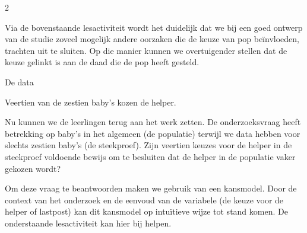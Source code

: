 \begin{multicols}{2}

Via de bovenstaande lesactiviteit wordt het duidelijk dat we bij een goed ontwerp van de studie zoveel mogelijk andere oorzaken die de keuze van pop beïnvloeden, trachten uit te sluiten. Op die manier kunnen we overtuigender stellen dat de keuze gelinkt is aan de daad die de pop heeft gesteld. 

\begin{kader}{}{De data}

Veertien van de zestien baby's kozen de helper. 
\end{kader}

Nu kunnen we de leerlingen terug aan het werk zetten. De onderzoeksvraag heeft betrekking op baby's in het algemeen (de populatie) terwijl we data hebben voor slechts zestien baby's (de steekproef). Zijn veertien keuzes voor de helper in de steekproef voldoende bewijs om te besluiten dat de helper in de populatie vaker gekozen wordt? 

Om deze vraag te beantwoorden maken we gebruik van een kansmodel. Door de context van het onderzoek en de eenvoud van de variabele (de keuze voor de helper of lastpost) kan dit kansmodel op intuïtieve wijze tot stand komen. De onderstaande lesactiviteit kan hier bij helpen. 
\end{multicols}

\clearpage

